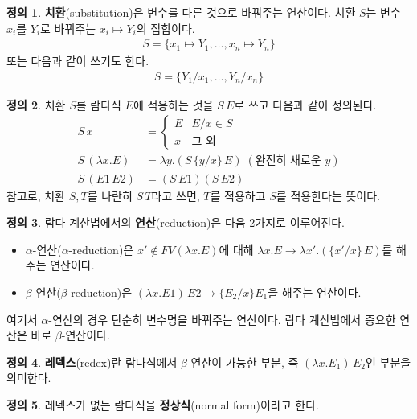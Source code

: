 \documentclass[b5paper, 11pt]{book}
\theoremstyle{definition}
\newtheorem{defn}{정의}[chapter]
\begin{document}
\begin{defn}
    \textbf{치환}(substitution)은 변수를 다른 것으로 바꿔주는 연산이다. 치환 $S$는 변수 $x_i$를
    $Y_i$로 바꿔주는 $x_i \mapsto Y_i$의 집합이다.
    \begin{align*}
        S = \{ x_1 \mapsto Y_1, \ldots, x_n \mapsto Y_n\}
    \end{align*}
    또는 다음과 같이 쓰기도 한다.
    \begin{align*}
        S = \{ Y_1 / x_1, \ldots, Y_n / x_n \}
    \end{align*}
\end{defn}
\begin{defn}
    치환 $S$를 람다식 $E$에 적용하는 것을 $S \, E$로 쓰고 다음과 같이 정의된다.
    \begin{align*}
        S \, x &= 
            \begin{cases}
                E & E/x \in S \\
                x & \text{그 외} 
            \end{cases}  \\ 
        S \, (\lambda x. E) &= \lambda y. (S \, \{ y/x\} \, E) \; (\text{완전히 새로운 } y) \\ 
        S \, (E1 \, E2) &= (S \, E1) (S \, E2) 
    \end{align*} 
    참고로, 치환 $S, T$를 나란히 $S \, T$라고 쓰면, $T$를 적용하고 $S$를 적용한다는 뜻이다.
\end{defn}
\begin{defn}
    람다 계산법에서의 \textbf{연산}(reduction)은 다음 2가지로 이루어진다.
    \begin{itemize}
        \item $\alpha$-연산($\alpha$-reduction)은 
        $x' \notin FV(\lambda x. E)$에 대해 
        $\lambda x. E \rightarrow \lambda x'. (\{x'/x\} \, E)$를 해주는 연산이다.
        \item $\beta$-연산($\beta$-reduction)은
        $(\lambda x. E1) \, E2 \rightarrow \{ E_2 / x\}E_1$을 해주는 연산이다.
    \end{itemize}
\end{defn}
여기서 $\alpha$-연산의 경우 단순히 변수명을 바꿔주는 연산이다. 람다 계산법에서 중요한 연산은 바로 $\beta$-연산이다. 
\begin{defn}
    \textbf{레덱스}(redex)란 람다식에서 $\beta$-연산이 가능한 부분, 즉 $( \lambda x. E_1 ) \, E_2$인 부분을 의미한다.
\end{defn}
\begin{defn}
    레덱스가 없는 람다식을 \textbf{정상식}(normal form)이라고 한다.
\end{defn}
\end{document}
